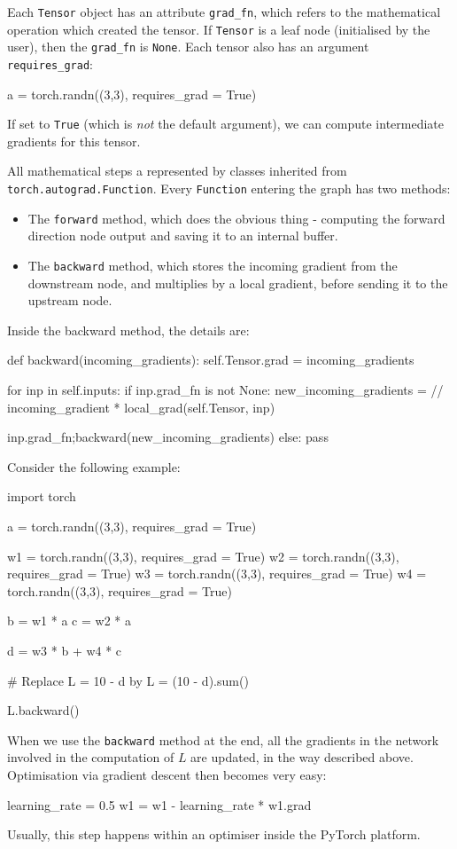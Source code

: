 Each \texttt{Tensor} object has an attribute \texttt{grad\_fn}, which refers to the mathematical operation which created the tensor. If \texttt{Tensor} is a leaf node (initialised by the user), then the \texttt{grad\_fn} is \texttt{None}. Each tensor also has an argument \texttt{requires\_grad}:
\begin{python}
a = torch.randn((3,3), requires_grad = True)
\end{python}
If set to \texttt{True} (which is \textit{not} the default argument), we can compute intermediate gradients for this tensor.





\newpage
All mathematical steps a represented by classes inherited from \texttt{torch.autograd.Function}. Every \texttt{Function} entering the graph has two methods:
\begin{itemize}
\item The \texttt{forward} method, which does the obvious thing - computing the forward direction node output and saving it to an internal buffer.
\item The \texttt{backward} method, which stores the incoming gradient from the downstream node, and multiplies by a local gradient, before sending it to the upstream node. 
\end{itemize}
Inside the backward method, the details are:
\begin{python}
def backward(incoming_gradients):
	self.Tensor.grad = incoming_gradients
	
	for inp in self.inputs:
		if inp.grad_fn is not None:
			new_incoming_gradients = // incoming_gradient * local_grad(self.Tensor, inp)
			
			inp.grad_fn;backward(new_incoming_gradients)
		else:
			pass
\end{python}

Consider the following example:

\begin{python}
import torch

a = torch.randn((3,3), requires_grad = True)

w1 = torch.randn((3,3), requires_grad = True)
w2 = torch.randn((3,3), requires_grad = True)
w3 = torch.randn((3,3), requires_grad = True)
w4 = torch.randn((3,3), requires_grad = True)

b = w1 * a
c = w2 * a

d  = w3 * b + w4 * c

# Replace L = 10 - d by
L = (10 - d).sum()

L.backward()
\end{python}
When we use the \texttt{backward} method at the end, all the gradients in the network involved in the computation of $L$ are updated, in the way described above. Optimisation via gradient descent then becomes very easy:
\begin{python}
learning_rate = 0.5
w1 = w1 - learning_rate * w1.grad
\end{python}
Usually, this step happens within an optimiser inside the PyTorch platform.


